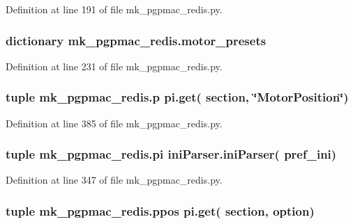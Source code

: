 Definition at line 191 of file mk\-\_\-pgpmac\-\_\-redis.\-py.

\hypertarget{namespacemk__pgpmac__redis_a2a04d8d0b7270384d1fac674c29e774a}{
\subsubsection[{motor\-\_\-presets}]{\setlength{\rightskip}{0pt plus 5cm}dictionary mk\-\_\-pgpmac\-\_\-redis.\-motor\-\_\-presets}}\label{namespacemk__pgpmac__redis_a2a04d8d0b7270384d1fac674c29e774a}


Definition at line 231 of file mk\-\_\-pgpmac\-\_\-redis.\-py.

\hypertarget{namespacemk__pgpmac__redis_a11daf2847f2dc94562b5b61b3f412574}{
\subsubsection[{p}]{\setlength{\rightskip}{0pt plus 5cm}tuple mk\-\_\-pgpmac\-\_\-redis.\-p pi.\-get( section, \char`\"{}Motor\-Position\char`\"{})}}\label{namespacemk__pgpmac__redis_a11daf2847f2dc94562b5b61b3f412574}


Definition at line 385 of file mk\-\_\-pgpmac\-\_\-redis.\-py.

\hypertarget{namespacemk__pgpmac__redis_a2f5bbda0250eecd94d166dc0a2fbff86}{
\subsubsection[{pi}]{\setlength{\rightskip}{0pt plus 5cm}tuple mk\-\_\-pgpmac\-\_\-redis.\-pi {\bf ini\-Parser.\-ini\-Parser}( {\bf pref\-\_\-ini})}}\label{namespacemk__pgpmac__redis_a2f5bbda0250eecd94d166dc0a2fbff86}


Definition at line 347 of file mk\-\_\-pgpmac\-\_\-redis.\-py.

\hypertarget{namespacemk__pgpmac__redis_aadd7321b8f7efe139c3e92e51cd34c00}{
\subsubsection[{ppos}]{\setlength{\rightskip}{0pt plus 5cm}tuple mk\-\_\-pgpmac\-\_\-redis.\-ppos pi.\-get( section, option)}}\label{namespacemk__pgpmac__redis_aadd7321b8f7efe139c3e92e51cd34c00}


